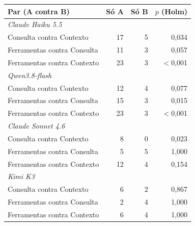 \begin{tabular}{lrrr}
\toprule
Par (A contra B) & Só A & Só B & $p$ (Holm) \\
\midrule
\multicolumn{4}{l}{\textit{Claude Haiku 5.5}} \\
Consulta contra Contexto & 17 & 5 & 0,034 \\
Ferramentas contra Consulta & 11 & 3 & 0,057 \\
Ferramentas contra Contexto & 23 & 3 & $<$0,001 \\
\midrule
\multicolumn{4}{l}{\textit{Qwen3.8-flash}} \\
Consulta contra Contexto & 12 & 4 & 0,077 \\
Ferramentas contra Consulta & 15 & 3 & 0,015 \\
Ferramentas contra Contexto & 23 & 3 & $<$0,001 \\
\midrule
\multicolumn{4}{l}{\textit{Claude Sonnet 4.6}} \\
Consulta contra Contexto & 8 & 0 & 0,023 \\
Ferramentas contra Consulta & 5 & 5 & 1,000 \\
Ferramentas contra Contexto & 12 & 4 & 0,154 \\
\midrule
\multicolumn{4}{l}{\textit{Kimi K3}} \\
Consulta contra Contexto & 6 & 2 & 0,867 \\
Ferramentas contra Consulta & 2 & 4 & 1,000 \\
Ferramentas contra Contexto & 6 & 4 & 1,000 \\
\bottomrule
\end{tabular}
